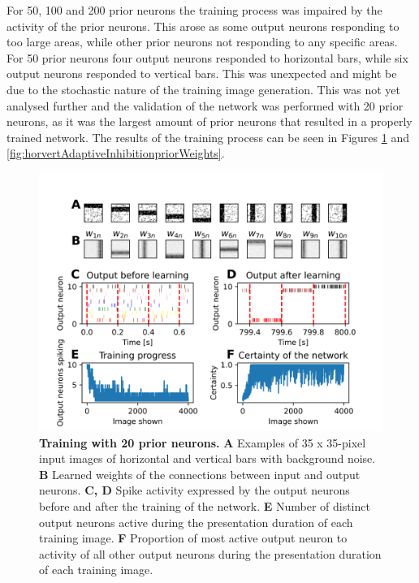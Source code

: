 For 50, 100 and 200 prior neurons the training process was impaired by the activity of the prior neurons. This arose as some output neurons responding to too large areas, while other prior neurons not responding to any specific areas. For 50 prior neurons four output neurons responded to horizontal bars, while six output neurons responded to vertical bars. This was unexpected and might be due to the stochastic nature of the training image generation. This was not yet analysed further and the validation of the network was performed with 20 prior neurons, as it was the largest amount of prior neurons that resulted in a properly trained network. The results of the training process can be seen in Figures \ref{fig:horvertAdaptiveInhibitionTraining} and \ref{fig:horvertAdaptiveInhibitionpriorWeights}.

\begin{figure}
  \includegraphics[width=\linewidth]{figures/horvertAdaptiveInh/trainingPlot.png}
  \caption{\textbf{Training with 20 prior neurons.} \textbf{A} Examples of 35 x 35-pixel input images of horizontal and vertical bars with background noise. \textbf{B} Learned weights of the connections between input and output neurons. \textbf{C, D} Spike activity expressed by the output neurons before and after the training of the network. \textbf{E} Number of distinct output neurons active during the presentation duration of each training image. \textbf{F} Proportion of most active output neuron  to activity of all other output neurons during the presentation duration of each training image.}
  \label{fig:horvertAdaptiveInhibitionTraining}
\end{figure}

